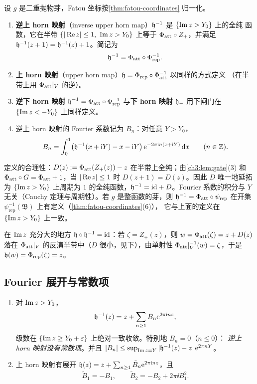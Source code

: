 \begin{definition}[horn 映射]\label{def:horn}
设 $g$ 是二重抛物芽，Fatou 坐标按\cref{thm:fatou-coordinates} 归一化。
\begin{enumerate}
\item \textbf{逆上 horn 映射}（inverse upper horn map）$\mathfrak h^{-1}$ 是 $\{\operatorname{Im} z>Y_0\}$ 上的全纯
 函数，它在半带 $\{|\operatorname{Re} z|\le1,\ \operatorname{Im} z>Y_0\}$ 上等于 $\Phi_{\mathrm{att}}\circ Z_+$，并满足
 $\mathfrak h^{-1}(z+1)=\mathfrak h^{-1}(z)+1$。简记为
 \[
  \mathfrak h^{-1}=\Phi_{\mathrm{att}}\circ\Phi_{\mathrm{rep}}^{-1}.
 \]
\item \textbf{上 horn 映射}（upper horn map）$\mathfrak h=\Phi_{\mathrm{rep}}\circ\Phi_{\mathrm{att}}^{-1}$ 以同样的方式定义
 （在半带上用 $\Phi_{\mathrm{att}}|_V$ 的逆）。
\item \textbf{逆下 horn 映射} $\mathfrak h_-^{-1}=\Phi_{\mathrm{att}}\circ\Phi_{\mathrm{rep}}^{-1}$ 与\textbf{下 horn 映射}
 $\mathfrak h_-$ 用下闸门在 $\{\operatorname{Im} z<-Y_0\}$ 上同样定义。
\item 逆上 horn 映射的 Fourier 系数记为 $B_n$：对任意 $Y>Y_0$，
 \[
  B_n=\int_0^1\bigl(\mathfrak h^{-1}(x+\mathrm{i} Y)-x-\mathrm{i} Y\bigr)\,\mathrm{e}^{-2\pi\mathrm{i} n(x+\mathrm{i} Y)}\,\mathrm{d} x
  \qquad(n\in\mathbb{Z}).
 \]
\end{enumerate}
\end{definition}

定义的合理性：$D(z):=\Phi_{\mathrm{att}}(Z_+(z))-z$ 在半带上全纯；由\cref{ch3:lem:gate}(3) 和
$\Phi_{\mathrm{att}}\circ G=\Phi_{\mathrm{att}}+1$，当 $|\operatorname{Re} z|\le1$ 时 $D(z+1)=D(z)$。因此 $D$ 唯一地延拓为
$\{\operatorname{Im} z>Y_0\}$ 上周期为 $1$ 的全纯函数，$\mathfrak h^{-1}=\mathrm{id}+D$。Fourier 系数的积分与 $Y$
无关（Cauchy 定理与周期性）。若 $g$ 是整函数的芽，则 $\mathfrak h^{-1}=\Phi_{\mathrm{att}}\circ\psi_{\mathrm{rep}}$
在开集 $\psi_{\mathrm{rep}}^{-1}(\mathfrak B)$ 上有定义（\cref{thm:fatou-coordinates}(6)），
它与上面的定义在 $\{\operatorname{Im} z>Y_0\}$ 上一致。

在 $\operatorname{Im} z$ 充分大的地方 $\mathfrak h\circ\mathfrak h^{-1}=\mathrm{id}$：若 $\zeta=Z_+(z)$，则
$w=\Phi_{\mathrm{att}}(\zeta)=z+D(z)$ 落在 $\Phi_{\mathrm{att}}|_V$ 的反演半带中（$D$ 很小，见下），由单射性
$\Phi_{\mathrm{att}}|_V^{-1}(w)=\zeta$，于是 $\mathfrak h(w)=\Phi_{\mathrm{rep}}(\zeta)=z$。

\subsection{Fourier 展开与常数项}

\begin{proposition}\label{ch3:prop:horn-expansion}
\begin{enumerate}
\item 对 $\operatorname{Im} z>Y_0$，
 \[
  \mathfrak h^{-1}(z)=z+\sum_{n\ge1}B_n\mathrm{e}^{2\pi\mathrm{i} nz},
 \]
 级数在 $\{\operatorname{Im} z\ge Y_0+\varepsilon\}$ 上绝对一致收敛。特别地 $B_n=0$（$n\le0$）：
 \emph{逆上 horn 映射没有常数项}。并且 $|B_n|\le\sup_{\operatorname{Im} z=Y}|\mathfrak h^{-1}(z)-z|\,\mathrm{e}^{2\pi nY}$。
\item 上 horn 映射有展开 $\mathfrak h(z)=z+\sum_{n\ge1}\tilde B_n\mathrm{e}^{2\pi\mathrm{i} nz}$，且
 \[
  \tilde B_1=-B_1,\qquad \tilde B_2=-B_2+2\pi\ii B_1^2 .
 \]
\end{enumerate}
\end{proposition}

